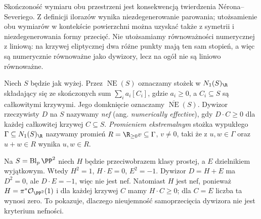 \begin{uwaga}
Skończoność wymiaru obu przestrzeni jest konsekwencją
twierdzenia Nérona--Severiego. Z definicji ilorazów
wynika niezdegenerowanie parowania; utożsamienie obu
wymiarów w kontekście powierzchni można uzyskać także
z symetrii i niezdegenerowania formy przecięć.
Nie utożsamiamy równoważności numerycznej z liniową:
na krzywej eliptycznej dwa różne punkty mają ten sam
stopień, a więc są numerycznie równoważne jako dywizory,
lecz na ogół nie są liniowo równoważne.
\end{uwaga}

\begin{definicja}
\label{def:ga8-nef}
Niech $S$ będzie jak wyżej. Przez $\operatorname{NE}(S)$
oznaczamy stożek w $N_1(S)_{\R}$ składający się ze
skończonych sum $\sum_i a_i[C_i]$, gdzie $a_i\ge0$,
a $C_i\subseteq S$ są całkowitymi krzywymi.
Jego domknięcie oznaczamy $\overline{\operatorname{NE}}(S)$.
Dywizor rzeczywisty $D$ na $S$ nazywamy \emph{nef}
(ang. \emph{numerically effective}), gdy $D\cdot C\ge0$
dla każdej całkowitej krzywej $C\subseteq S$.
\emph{Promieniem ekstremalnym} stożka wypukłego
$\Gamma\subseteq N_1(S)_{\R}$ nazywamy promień
$R=\R_{\ge0}v\subseteq\Gamma$, $v\ne0$, taki że
z $u,w\in\Gamma$ oraz $u+w\in R$ wynika $u,w\in R$.
\end{definicja}

\begin{przyklad}
Na $S=\operatorname{Bl}_p\PP^2$ niech $H$ będzie
przeciwobrazem klasy prostej, a $E$ dzielnikiem wyjątkowym.
Wtedy $H^2=1$, $H\cdot E=0$, $E^2=-1$.
Dywizor $D=H+E$ ma $D^2=0$, ale $D\cdot E=-1$,
więc nie jest nef. Natomiast $H$ jest nef, ponieważ
$H=\pi^*\mathcal O_{\PP^2}(1)$ i dla każdej krzywej
$C$ mamy $H\cdot C\ge0$; dla $C=E$ liczba ta wynosi zero.
To pokazuje, dlaczego nieujemność samoprzecięcia
dywizora nie jest kryterium nefności.
\end{przyklad}

